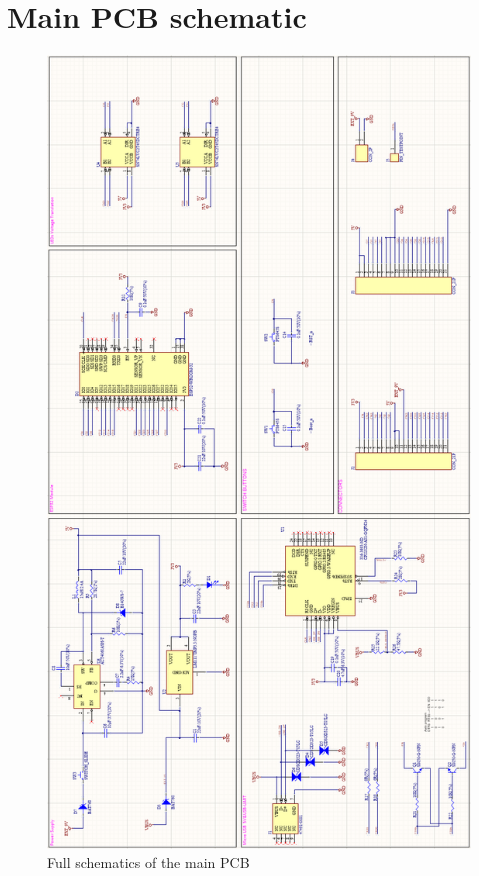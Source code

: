 \newpage
\section{Main PCB schematic}
\label{appendix:main_pcb_schematic}

\begin{figure}[H]
    \centering
    \includegraphics[height=0.9\textheight]{images/EE_fullPCBschematic.PNG}
    \caption{Full schematics of the main PCB}
    \label{fig:main_pcb_schematic}
\end{figure}